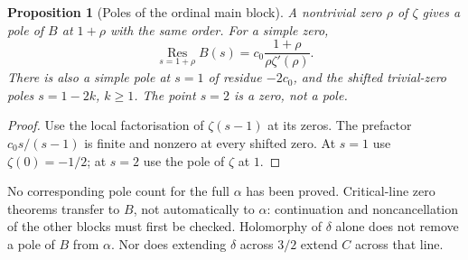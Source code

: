 \documentclass[11pt]{amsart}
\numberwithin{equation}{section}
\theoremstyle{plain}
\newtheorem{proposition}[theorem]{Proposition}
\theoremstyle{definition}
\theoremstyle{remark}
\begin{document}
\begin{proposition}[Poles of the ordinal main block]
\label{prop:a12-poles}
A nontrivial zero $\rho$ of $\zeta$ gives a pole of $B$ at $1+\rho$ with
the same order. For a simple zero,
\begin{equation}
\label{eq:a12-residue}
\operatorname*{Res}_{s=1+\rho}B(s)
=c_0\frac{1+\rho}{\rho\zeta'(\rho)}.
\end{equation}
There is also a simple pole at $s=1$ of residue $-2c_0$, and the shifted
trivial-zero poles $s=1-2k$, $k\ge1$. The point $s=2$ is a zero, not a pole.
\end{proposition}
\begin{proof}
Use the local factorisation of $\zeta(s-1)$ at its zeros.
The prefactor $c_0s/(s-1)$ is finite and nonzero at every shifted zero.
At $s=1$ use $\zeta(0)=-1/2$; at $s=2$ use the pole of $\zeta$ at $1$.
\end{proof}

No corresponding pole count for the full $\alpha$ has been proved.
Critical-line zero theorems transfer to $B$, not automatically to $\alpha$:
continuation and noncancellation of the other blocks must first be checked.
Holomorphy of $\delta$ alone does not remove a pole of $B$ from $\alpha$.
Nor does extending $\delta$ across $3/2$ extend $C$ across that line.
\end{document}
